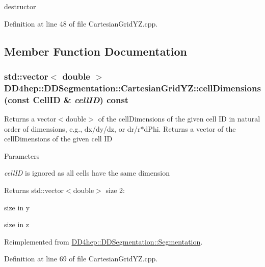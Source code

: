 destructor 

Definition at line 48 of file CartesianGridYZ.cpp.

\subsection{Member Function Documentation}
\hypertarget{class_d_d4hep_1_1_d_d_segmentation_1_1_cartesian_grid_y_z_a8422ef9feccf16729b9c3b2e63a284a7}{
\subsubsection[{cellDimensions}]{\setlength{\rightskip}{0pt plus 5cm}std::vector$<$ double $>$ DD4hep::DDSegmentation::CartesianGridYZ::cellDimensions (const {\bf CellID} \& {\em cellID}) const}}
\label{class_d_d4hep_1_1_d_d_segmentation_1_1_cartesian_grid_y_z_a8422ef9feccf16729b9c3b2e63a284a7}


Returns a vector$<$double$>$ of the cellDimensions of the given cell ID in natural order of dimensions, e.g., dx/dy/dz, or dr/r$\ast$dPhi. Returns a vector of the cellDimensions of the given cell ID 
\begin{DoxyParams}{Parameters}
\item[{\em cellID}]is ignored as all cells have the same dimension \end{DoxyParams}
\begin{DoxyReturn}{Returns}
std::vector$<$double$>$ size 2:
\begin{DoxyEnumerate}
\item size in y
\item size in z 
\end{DoxyEnumerate}
\end{DoxyReturn}


Reimplemented from \hyperlink{class_d_d4hep_1_1_d_d_segmentation_1_1_segmentation_a9710f4942d7f6b52ae5342652e17c88d}{DD4hep::DDSegmentation::Segmentation}.

Definition at line 69 of file CartesianGridYZ.cpp.

